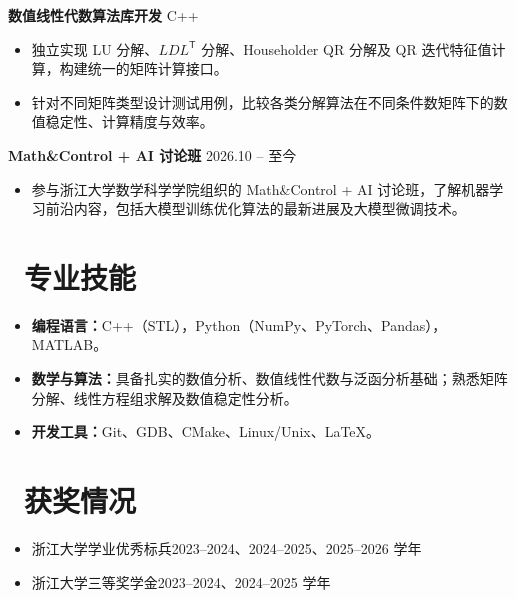 \documentclass[11pt]{article}
\newlength{\interProjectSpacing}
\newcommand{\projectsep}{\par\vspace{\interProjectSpacing}}
\newcommand{\cvsection}[2]{%
    \section{\texorpdfstring{\makebox[1.25em][c]{\color{CVBlue}\mdseries#1}\ #2}{#2}}%
}
\begin{document}
\projectsep
\textbf{数值线性代数算法库开发} \hfill C++
\begin{itemize}
    \item 独立实现 LU 分解、$LDL^{\mathsf T}$ 分解、Householder QR 分解及 QR 迭代特征值计算，构建统一的矩阵计算接口。
    \item 针对不同矩阵类型设计测试用例，比较各类分解算法在不同条件数矩阵下的数值稳定性、计算精度与效率。
\end{itemize}

\projectsep
\textbf{Math\&Control + AI 讨论班} \hfill 2026.10 -- 至今
\begin{itemize}
    \item 参与浙江大学数学科学学院组织的 Math\&Control + AI 讨论班，了解机器学习前沿内容，包括大模型训练优化算法的最新进展及大模型微调技术。
\end{itemize}

\cvsection{\faCogs}{专业技能}
\begin{itemize}
    \item \textbf{编程语言：}C++（STL），Python（NumPy、PyTorch、Pandas），MATLAB。
    \item \textbf{数学与算法：}具备扎实的数值分析、数值线性代数与泛函分析基础；熟悉矩阵分解、线性方程组求解及数值稳定性分析。
    \item \textbf{开发工具：}Git、GDB、CMake、Linux/Unix、\LaTeX。
\end{itemize}

\cvsection{\faList}{获奖情况}
\begin{itemize}
    \item 浙江大学学业优秀标兵\hfill 2023--2024、2024--2025、2025--2026 学年
    \item 浙江大学三等奖学金\hfill 2023--2024、2024--2025 学年
\end{itemize}
\end{document}
